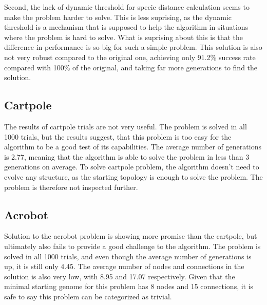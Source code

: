\documentclass{article}
\begin{document}
    Second, the lack of dynamic threshold for specie distance calculation seems to make the problem harder to solve.
    This is less suprising, as the dynamic threshold is a mechanism that is supposed to help the algorithm in situations
    where the problem is hard to solve. What is suprising about this is that the difference in performance is so big for
    such a simple problem. This solution is also not very robust compared to the original one, achieving only 91.2\% success rate
    compared with 100\% of the original, and taking far more generations to find the solution.
\subsection{Cartpole}
    The results of cartpole trials are not very useful. The problem is solved in all 1000 trials, but the results suggest, that 
    this problem is too easy for the algorithm to be a good test of its capabilities. The average number of generations is 2.77, 
    meaning that the algorithm is able to solve the problem in less than 3 generations on average. To solve cartpole problem, the
    algorithm doesn't need to evolve any structure, as the starting topology is enough to solve the problem. The problem is therefore
    not inspected further.
\subsection{Acrobot}
    Solution to the acrobot problem is showing more promise than the cartpole, but ultimately also fails to provide a 
    good challenge to the algorithm. The problem is solved in all 1000 trials, and even though the average number of generations is up, it 
    is still only 4.45. The average number of nodes and connections in the solution is also very low, with 8.95 and 17.07 respectively. 
    Given that the minimal starting genome for this problem has 8 nodes and 15 connections, it is safe to say this problem can be 
    categorized as trivial.
\end{document}
